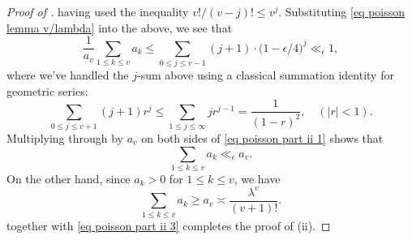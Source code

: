 \documentclass{amsart}
\theoremstyle{definition}
\numberwithin{equation}{section}
\begin{document}
\begin{proof}[Proof of ]
	having used the inequality $v!/(v-j)! \leq v^j$. Substituting \eqref{eq poisson lemma v/lambda} into the above, we see that
	\begin{equation}\label{eq poisson part ii 1}
		\frac{1}{a_v}\sum_{1 \leq k \leq v} a_k \leq \sum_{0 \leq j \leq v-1} (j+1) \cdot \big(1-\epsilon/4 \big)^j \ll_\epsilon 1,
	\end{equation}
	where we've handled the $j$-sum above using a classical summation identity for geometric series:
	$$\sum_{0 \leq j \leq v+1}(j+1) r^j \leq \sum_{1 \leq j \leq \infty}j r^{j-1} = \frac{1}{(1-r)^2}, \quad (|r| < 1).$$
	Multiplying through by $a_v$ on both sides of \eqref{eq poisson part ii 1} shows that
	\begin{equation}\label{eq poisson part ii 2}
		\sum_{1 \leq k \leq v} a_k \ll_\epsilon a_v.
	\end{equation}
	On the other hand, since $a_k > 0$ for $1 \leq k \leq v$, we have
	\begin{equation}\label{eq poisson part ii 3}
		\sum_{1 \leq k \leq v} a_k \ge   a_v \asymp \frac{\lambda^{v}}{(v+1)!}.
	\end{equation}
	 together with \eqref{eq poisson part ii 3} completes the proof of (ii).
	

\end{proof}
\end{document}
